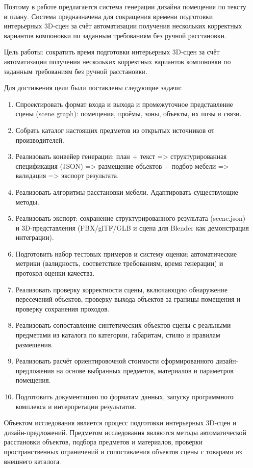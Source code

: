 \documentclass[times]{itmo-student-thesis}
\begin{document}
Поэтому в работе предлагается система генерации дизайна помещения по тексту и плану. Система предназначена для сокращения времени подготовки интерьерных 3D-сцен за счёт автоматизации получения нескольких корректных вариантов компоновки по заданным требованиям без ручной расстановки.

Цель работы: сократить время подготовки интерьерных 3D-сцен за счёт автоматизации получения нескольких корректных вариантов компоновки по заданным требованиям без ручной расстановки.

Для достижения цели были поставлены следующие задачи:
\begin{enumerate}
  \item Спроектировать формат входа и выхода и промежуточное представление сцены (scene graph): помещения, проёмы, зоны, объекты, их позы и связи.
  \item Собрать каталог настоящих предметов из открытых источников от производителей.
  \item Реализовать конвейер генерации: план + текст => структурированная спецификация (JSON) => размещение объектов + подбор мебели => валидация => экспорт результата.
  \item Реализовать алгоритмы расстановки мебели. Адаптировать существующие методы.
  \item Реализовать экспорт: сохранение структурированного результата (scene.json) и 3D-представления (FBX/glTF/GLB и сцена для Blender как демонстрация интеграции).
  \item Подготовить набор тестовых примеров и систему оценки: автоматические метрики (валидность, соответствие требованиям, время генерации) и протокол оценки качества.
  \item Реализовать проверку корректности сцены, включающую обнаружение пересечений объектов, проверку выхода объектов за границы помещения и проверку сохранения проходов.
  \item Реализовать сопоставление синтетических объектов сцены с реальными предметами из каталога по категории, габаритам, стилю и правилам размещения.
  \item Реализовать расчёт ориентировочной стоимости сформированного дизайн-предложения на основе выбранных предметов, материалов и параметров помещения.
  \item Подготовить документацию по форматам данных, запуску программного комплекса и интерпретации результатов.
\end{enumerate}

Объектом исследования является процесс подготовки интерьерных 3D-сцен и дизайн-предложений. Предметом исследования являются методы автоматической расстановки объектов, подбора предметов и материалов, проверки пространственных ограничений и сопоставления объектов сцены с товарами из внешнего каталога.
\end{document}
